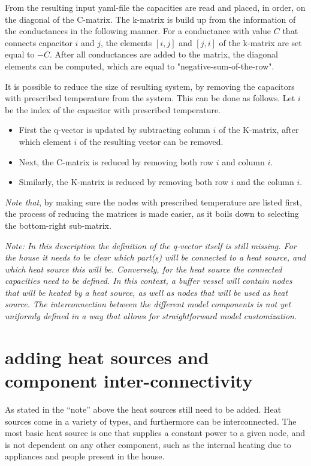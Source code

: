 From the resulting input yaml-file the capacities are read and placed, in order, on the diagonal of the C-matrix. The k-matrix is build up from the information of the conductances in the following manner. For a conductance with value $C$ that connects capacitor $i$ and $j$, the elements $[i,j]$ and $[j,i]$ of the k-matrix are set equal to $-C$. After all conductances are added to the matrix, the diagonal elements can be computed, which are equal to "negative-sum-of-the-row". 

It is possible to reduce the size of resulting system, by removing the capacitors with prescribed temperature from the system. This can be done as follows. 
Let $i$ be the index of the capacitor with prescribed temperature. 
\begin{itemize}
\item First the q-vector is updated by subtracting column $i$ of the K-matrix, after which element $i$ of the resulting vector can be removed. 
\item Next, the C-matrix is reduced by removing both row $i$ and column $i$.  
\item Similarly, the K-matrix is reduced by removing both row $i$ and the column $i$. 
\end{itemize}

\emph{Note that}, by making sure the nodes with prescribed temperature are listed first, the process of reducing the matrices is made easier, as it
boils down to selecting the bottom-right sub-matrix. 

\emph{Note: In this description the definition of the q-vector itself is still missing. For the house it needs to be clear which part(s) will be connected to a heat source, and which heat source this will be. Conversely, for the heat source the connected capacities need to be defined. In this context, a buffer vessel will contain nodes that will be heated by a heat source, as well as nodes that will be used as heat source. The interconnection between the different model components is not yet uniformly defined in a way that allows for straightforward model customization.}

\section{adding heat sources and component inter-connectivity}
As stated in the "`note"' above the heat sources still need to be added. Heat sources come in a variety of types, and furthermore can be interconnected. The most basic heat source is one that supplies a constant power to a given node, and is not dependent on any other component, such as the internal heating due to appliances and people present in the house. 

